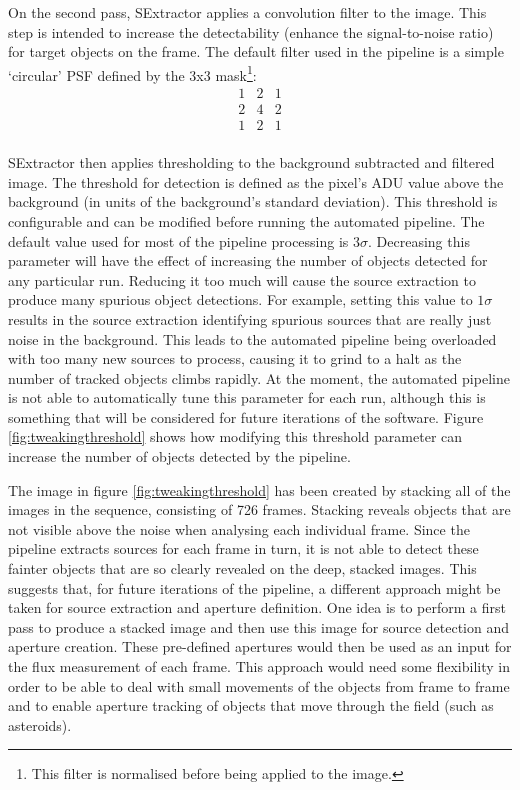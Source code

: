 On the second pass, SExtractor applies a convolution filter to the image. This step is intended to increase the detectability (enhance the signal-to-noise ratio) for target objects on the frame. The default filter used in the pipeline is a simple `circular' PSF defined by the 3x3 mask\footnote{This filter is normalised before being applied to the image.}:
\[
\begin{array}{ccc}
  1 & 2 & 1 \\
  2 & 4 & 2 \\
  1 & 2 & 1 \\
\end{array}  
\]

SExtractor then applies thresholding to the background subtracted and filtered image. The threshold for detection is defined as the pixel's ADU value above the background (in units of the background's standard deviation). This threshold is configurable and can be modified before running the automated pipeline. The default value used for most of the pipeline processing is $3\sigma$. Decreasing this parameter will have the effect of increasing the number of objects detected for any particular run. Reducing it too much will cause the source extraction to produce many spurious object detections. For example, setting this value to $1\sigma$ results in the source extraction identifying spurious sources that are really just noise in the background. This leads to the automated pipeline being overloaded with too many new sources to process, causing it to grind to a halt as the number of tracked objects climbs rapidly. At the moment, the automated pipeline is not able to automatically tune this parameter for each run, although this is something that will be considered for future iterations of the software. Figure \ref{fig:tweakingthreshold} shows how modifying this threshold parameter can increase the number of objects detected by the pipeline.

The image in figure \ref{fig:tweakingthreshold} has been created by stacking all of the images in the sequence, consisting of 726 frames. Stacking reveals objects that are not visible above the noise when analysing each individual frame. Since the pipeline extracts sources for each frame in turn, it is not able to detect these fainter objects that are so clearly revealed on the deep, stacked images. This suggests that, for future iterations of the pipeline, a different approach might be taken for source extraction and aperture definition. One idea is to perform a first pass to produce a stacked image and then use this image for source detection and aperture creation. These pre-defined apertures would then be used as an input for the flux measurement of each frame. This approach would need some flexibility in order to be able to deal with small movements of the objects from frame to frame and to enable aperture tracking of objects that move through the field (such as asteroids).

